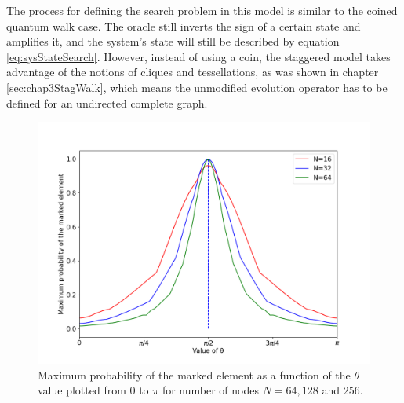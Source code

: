 \documentclass[../../dissertation.tex]{subfiles}
\begin{document}
The process for defining the search problem in this model is similar to the
coined quantum walk case. The oracle still inverts the sign of a certain state
and amplifies it, and the system's state will still be described by equation
\ref{eq:sysStateSearch}. However, instead of using a coin, the staggered model
takes advantage of the notions of cliques and tessellations, as was shown in
chapter \ref{sec:chap3StagWalk}, which means the unmodified evolution operator
has to be defined for an undirected complete graph.
\begin{figure}[!h]
	\centering
	\includegraphics[scale=0.40]{img/StagQuantumWalk/Search/Theta163264.png}
	\caption{Maximum probability of the marked element as a function of the $\theta$ value plotted from $0$ to $\pi$ for number of nodes $N=64,128$ and $256$.} 
	\label{fig:stagMultTheta}
\end{figure}\par
\end{document}
